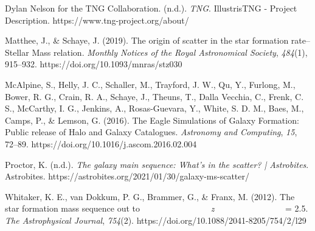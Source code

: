 \documentclass{article}
\begin{document}
Dylan Nelson for the TNG Collaboration. (n.d.). \textit{TNG}. IllustrisTNG - Project Description. https://www.tng-project.org/about/ 

Matthee, J., \& Schaye, J. (2019). The origin of scatter in the star formation rate–Stellar Mass relation. \textit{Monthly Notices of the Royal Astronomical Society}, \textit{484}(1), 915–932. https://doi.org/10.1093/mnras/stz030 

McAlpine, S., Helly, J. C., Schaller, M., Trayford, J. W., Qu, Y., Furlong, M., Bower, R. G., Crain, R. A., Schaye, J., Theuns, T., Dalla Vecchia, C., Frenk, C. S., McCarthy, I. G., Jenkins, A., Rosas-Guevara, Y., White, S. D. M., Baes, M., Camps, P., \& Lemson, G. (2016). The Eagle Simulations of Galaxy Formation: Public release of Halo and Galaxy Catalogues. \textit{Astronomy and Computing}, \textit{15}, 72–89. https://doi.org/10.1016/j.ascom.2016.02.004 

Proctor, K. (n.d.). \textit{The galaxy main sequence: What’s in the scatter? | Astrobites}. Astrobites. https://astrobites.org/2021/01/30/galaxy-ms-scatter/ 

Whitaker, K. E., van Dokkum, P. G., Brammer, G., \& Franx, M. (2012). The star formation mass sequence out to                    \textit{z}                    = 2.5. \textit{The Astrophysical Journal}, \textit{754}(2). https://doi.org/10.1088/2041-8205/754/2/l29 
\end{document}
